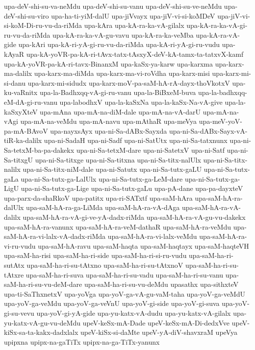 {upa-deV-shi-su-va-neMdu
upa-deV-shi-su-vanu
upa-deV-shi-su-ve-neMdu
upa-deV-shi-su-viro
upa-ha-ti-yiM-dalU
upa-jiVvayx
upa-jiV-vi-si-koMDeV
upa-jiV-vi-si-koM-Di-ru-vu-da-riMda
upa-kAra
upa-kA-ra-ka-vA-gilalx
upa-kA-ra-ka-vA-gi-ru-vu-da-riMda
upa-kA-ra-ka-vA-gu-vavu
upa-kA-ra-ka-veMba
upa-kA-ra-vA-gide
upa-kAri
upa-kA-ri-yA-gi-ru-vu-da-riMda
upa-kA-ri-yA-gi-ru-vudu
upa-kAyaR
upa-kA-yoVR-pa-kA-ri-tAvx-tatx-tAsxyX-deV-kA-tamx-ta-tatxvX-kamf
upa-kA-yoVR-pa-kA-ri-tavx-BinanxM
upa-kaSx-ya-karw
upa-karxma
upa-karx-ma-dalilx
upa-karx-ma-diMda
upa-karx-ma-vi-roVdha
upa-karx-misi
upa-karx-mi-si-danu
upa-karx-mi-sidudx
upa-karx-moV-pa-saM-hA-rA-dayx-thoVkotxV
upa-ku-vaRnitx
upa-la-Badhxqq-vA-gi-ru-vanu
upa-la-BiBxeM-buva
upa-la-badhxqq-eM-dA-gi-ru-vanu
upa-labodhxV
upa-la-kaSxNa
upa-la-kaSx-Na-vA-give
upa-la-kaSxyXteV
upa-mAna
upa-mA-na-diM-dale
upa-mA-na-vA-darU
upa-mA-na-vAgi
upa-mA-na-veMdu
upa-mA-navu
upa-mAthaR
upa-meVya
upa-meV-yoV-pa-mA-BAvoV
upa-nayxsAyx
upa-ni-Sa-dABx-Sayxda
upa-ni-Sa-dABx-Sayx-vA-tiR-ka-dalilx
upa-ni-SadaH
upa-ni-Sadf
upa-ni-SatUtx
upa-ni-Sa-tatxnunx
upa-ni-Sa-tetxM-ba-pa-dakekx
upa-ni-Sa-tetxM-dare
upa-ni-SatetxV
upa-ni-Satf
upa-ni-Sa-titxgU
upa-ni-Sa-titxge
upa-ni-Sa-titxna
upa-ni-Sa-titx-nalUlx
upa-ni-Sa-titx-nalilx
upa-ni-Sa-titx-niM-dale
upa-ni-Satutx
upa-ni-Sa-tutx-gaLU
upa-ni-Sa-tutx-gaLa
upa-ni-Sa-tutx-ga-LalUlx
upa-ni-Sa-tutx-ga-LeM-dare
upa-ni-Sa-tutx-ga-LigU
upa-ni-Sa-tutx-ga-Lige
upa-ni-Sa-tutx-gaLu
upa-pA-dane
upa-pa-dayxteV
upa-parx-da-shaRkoV
upa-patitx
upa-ri-SATxtf
upa-saM-hAra
upa-saM-hA-ra-dalUlx
upa-saM-hA-ra-ga-LiMda
upa-saM-hA-ra-vA-dAga
upa-saM-hA-ra-vA-dalilx
upa-saM-hA-ra-vA-gi-ve-yA-dadx-riMda
upa-saM-hA-ra-vA-gu-vu-dakekx
upa-saM-hA-ra-vanunx
upa-saM-hA-ra-veM-dathaR
upa-saM-hA-ra-veMdu
upa-saM-hA-ra-vi-lalx-vA-dadx-riMda
upa-saM-hA-ra-vi-lalx-veMdu
upa-saM-hA-ra-vi-ru-vudu
upa-saM-hA-ravu
upa-saM-haqta
upa-saM-haqtayx
upa-saM-haqteVH
upa-saM-ha-risi
upa-saM-ha-ri-side
upa-saM-ha-ri-si-ru-vudu
upa-saM-ha-ri-sutAtx
upa-saM-ha-ri-su-tAtxno
upa-saM-ha-ri-su-tAtxnoV
upa-saM-ha-ri-su-tAtxre
upa-saM-ha-ri-suva
upa-saM-ha-ri-su-vadu
upa-saM-ha-ri-su-vanu
upa-saM-ha-ri-su-vu-deM-dare
upa-saM-ha-ri-su-vu-deMdu
upasathx
upa-sithxteV
upa-ti-SaThxnetxV
upa-yoVga
upa-yoV-ga-vA-gu-vaM-taha
upa-yoV-ga-veMdU
upa-yoV-ga-veMdu
upa-yoV-ga-veVnU
upa-yoV-gi-side
upa-yoV-gi-suva
upa-yoV-gi-su-vevu
upa-yoV-gi-yA-gide
upa-yu-katx-vA-dudu
upa-yu-katx-vA-gilalx
upa-yu-katx-vA-gu-vu-deMdu
upeV-keSx-mA-Dade
upeV-keSx-mA-Di-dedxVve
upeV-kiSx-sa-ta-kakx-dadxlalx
upeV-kiSx-si-daMte
upeV-yA-diV-shavxraM
upeVya
upipxna
upipx-na-gaTiTx
upipx-na-ga-TiTx-yanunx
}
